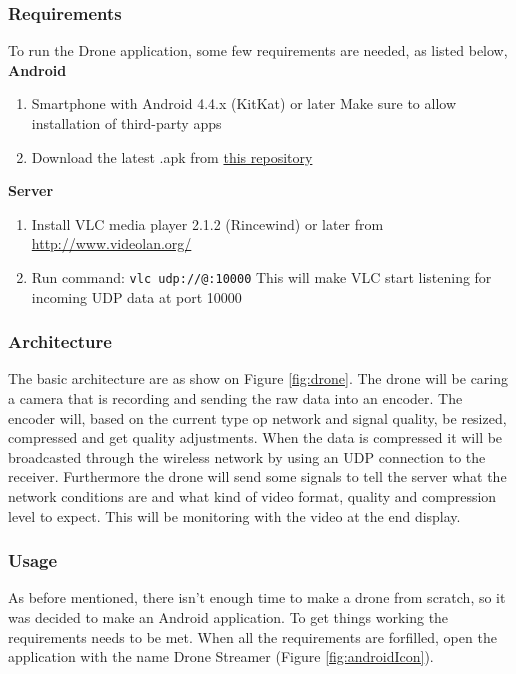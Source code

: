 \subsubsection{Requirements}

To run the Drone application, some few requirements are needed, as listed below,\\

\noindent\textbf{Android}
\begin{enumerate}
    \item Smartphone with Android 4.4.x (KitKat) or later
        \subitem Make sure to allow installation of third-party apps
    \item Download the latest .apk from \href{https://github.com/martinjlowm/34220_project_variable_bit_rate/raw/master/android/DroneStreamer/releases/}{this repository}
\end{enumerate}

\noindent\textbf{Server}
\begin{enumerate}
    \item Install VLC media player 2.1.2 (Rincewind) or later from \href{http://www.videolan.org/}{http://www.videolan.org/}
    \item Run command: \texttt{vlc udp://@:10000}
        \subitem This will make VLC start listening for incoming UDP data at port 10000
\end{enumerate}


\subsubsection{Architecture}
The basic architecture are as show on Figure \ref{fig:drone}. The drone will be caring a camera that is recording and sending the raw data into an encoder. The encoder will, based on the current type op network and signal quality, be resized, compressed and get quality adjustments. When the data is compressed it will be broadcasted through the wireless network by using an UDP connection to the receiver. Furthermore the drone will send some signals to tell the server what the network conditions are and what kind of video format, quality and compression level to expect. This will be monitoring with the video at the end display.


\subsubsection{Usage}
As before mentioned, there isn't enough time to make a drone from scratch, so it was decided to make an Android application. To get things working the requirements needs to be met. When all the requirements are forfilled, open the application with the name Drone Streamer (Figure \ref{fig:androidIcon}).

